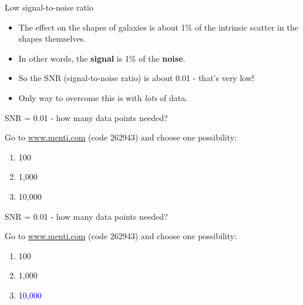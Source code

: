 \documentclass[usenames,dvipsnames]{beamer}
\newcommand{\mentiurl}[0]{{\url{www.menti.com}}}
\newcommand{\menticode}[0]{{262943}}
\newcommand{\mentiinvitation}[0]{Go to \mentiurl{} (code \menticode{}) and choose one possibility:\\}
\newcommand{\correctanswer}[1]{\textcolor{blue}{{#1} \checkmark}}
\begin{document}
\begin{frame}{Low signal-to-noise ratio}
  \begin{block}{}
    \begin{itemize}
      \item{The effect on the shapes of galaxies is about 1\% of the intrinsic scatter in the shapes themselves.}
      \item{In other words, the \textbf{signal} is 1\% of the \textbf{noise}.}
      \item{So the SNR (signal-to-noise ratio) is about 0.01  - that's very low!}
      \item{Only way to overcome this is with \textit{lots} of data.}
    \end{itemize}
  \end{block}
\end{frame}

\begin{frame}{SNR = 0.01 - how many data points needed?}
  \begin{block}{}
    \mentiinvitation{}
    \begin{enumerate}
      \item{100}
      \item{1,000}
      \item{10,000}
    \end{enumerate}
  \end{block}
\end{frame}

\begin{frame}{SNR = 0.01 - how many data points needed?}
  \begin{block}{}
    \mentiinvitation{}
    \begin{enumerate}
      \item{100}
      \item{1,000}
      \item{\correctanswer{10,000}}
    \end{enumerate}
  \end{block}
\end{frame}

 
\end{document}
